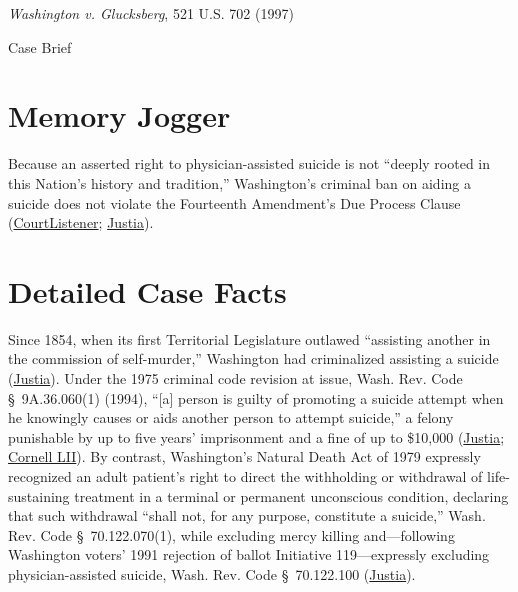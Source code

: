 \documentclass[12pt]{article}
\begin{document}
\begin{center}
{\LARGE \textit{Washington v. Glucksberg}, 521 U.S. 702 (1997)\par}
\vspace{0.8em}
{\large Case Brief\par}
\end{center}
\vspace{1em}

\section{Memory Jogger}

Because an asserted right to physician-assisted suicide is not ``deeply rooted in this Nation's history and tradition,'' Washington's criminal ban on aiding a suicide does not violate the Fourteenth Amendment's Due Process Clause (\href{https://www.courtlistener.com/opinion/118144/washington-v-glucksberg/}{CourtListener}; \href{https://supreme.justia.com/cases/federal/us/521/702/}{Justia}).

\section{Detailed Case Facts}

Since 1854, when its first Territorial Legislature outlawed ``assisting another in the commission of self-murder,'' Washington had criminalized assisting a suicide (\href{https://supreme.justia.com/cases/federal/us/521/702/}{Justia}). Under the 1975 criminal code revision at issue, Wash. Rev. Code \S~9A.36.060(1) (1994), ``[a] person is guilty of promoting a suicide attempt when he knowingly causes or aids another person to attempt suicide,'' a felony punishable by up to five years' imprisonment and a fine of up to \$10,000 (\href{https://supreme.justia.com/cases/federal/us/521/702/}{Justia}; \href{https://www.law.cornell.edu/supct/html/96-110.ZO.html}{Cornell LII}). By contrast, Washington's Natural Death Act of 1979 expressly recognized an adult patient's right to direct the withholding or withdrawal of life-sustaining treatment in a terminal or permanent unconscious condition, declaring that such withdrawal ``shall not, for any purpose, constitute a suicide,'' Wash. Rev. Code \S~70.122.070(1), while excluding mercy killing and---following Washington voters' 1991 rejection of ballot Initiative 119---expressly excluding physician-assisted suicide, Wash. Rev. Code \S~70.122.100 (\href{https://supreme.justia.com/cases/federal/us/521/702/}{Justia}).
\end{document}
